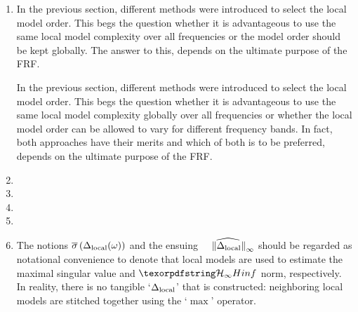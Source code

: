 \documentclass{responseletter}
\begin{document}
\begin{enumerate}
\item 
{}
\begin{oldquote}
In the previous section, different methods were introduced to select the local model order. 
This begs the question whether it is advantageous to use the same local model complexity over all frequencies or the model order should be kept globally. 
The answer to this, depends on the ultimate purpose of the \gls{FRF}.
\end{oldquote}
\begin{newquote}
In the previous section, different methods were introduced to select the local model order.
This begs the question whether it is advantageous to use the same local model complexity globally over all frequencies or whether the local model order can be allowed to vary for different frequency bands.
In fact, both approaches have their merits and which of both is to be preferred, depends on the ultimate purpose of the \gls{FRF}.
\end{newquote}

  \item 
   \replacedBy 

   \item 
   \replacedBy

   \item 
   \replacedBy

  \item
  \replacedBy

  \item
  \begin{newquote}
  \begin{remark}{4.3}
The notions $ \overline{\sigma} \left( \Delta_{\mathrm{local}}(\omega) \right) $ and the ensuing  $\widehat{\phantom{_\infty}\left\| \Delta_{\mathrm{local}} \right\|_{\infty}}$  should be regarded as notational convenience to denote that local models are used to estimate the maximal singular value and $\Hinf{}$ norm, respectively.
In reality, there is no tangible `$\Delta_{\mathrm{local}}$' that is constructed: neighboring local models are stitched together using the `$\max$' operator.
\end{remark}
  \end{newquote}

\end{enumerate}
\end{document}
